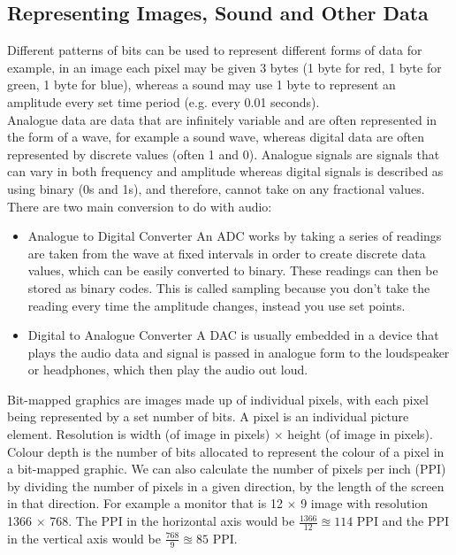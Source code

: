 \subsection{Representing Images, Sound and Other Data}
  \noindent
  Different patterns of bits can be used to represent different forms of data for example, in an image each pixel may be given 3 bytes (1 byte for red, 1 byte for green, 1 byte for blue), whereas a sound may use 1 byte to represent an amplitude every set time period (e.g. every 0.01 seconds).\\
  Analogue data are data that are infinitely variable and are often represented in the form of a wave, for example a sound wave, whereas digital data are often represented by discrete values (often 1 and 0). Analogue signals are signals that can vary in both frequency and amplitude whereas digital signals is described as using binary (0s and 1s), and therefore, cannot take on any fractional values.\\
  There are two main conversion to do with audio:
  \begin{itemize}
    \setlength{\itemsep}{0em}
    \item Analogue to Digital Converter
      \subitem An ADC works by taking a series of readings are taken from the wave at fixed intervals in order to create discrete data values, which can be easily converted to binary. These readings can then be stored as binary codes. This is called sampling because you don't take the reading every time the amplitude changes, instead you use set points.
    \item Digital to Analogue Converter
      \subitem A DAC is usually embedded in a device that plays the audio data and signal is passed in analogue form to the loudspeaker or headphones, which then play the audio out loud.
  \end{itemize}
  Bit-mapped graphics are images made up of individual pixels, with each pixel being represented by a set number of bits. A pixel is an individual picture element. Resolution is width (of image in pixels) $\times$ height (of image in pixels). Colour depth is the number of bits allocated to represent the colour of a pixel in a bit-mapped graphic. We can also calculate the number of pixels per inch (PPI) by dividing the number of pixels in a given direction, by the length of the screen in that direction. For example a monitor that is 12 $\times$ 9 image with resolution 1366 $\times$ 768. The PPI in the horizontal axis would be $\frac{1366}{12}\approxeq114$ PPI and the PPI in the vertical axis would be $\frac{768}{9}\approxeq85$ PPI.\\
